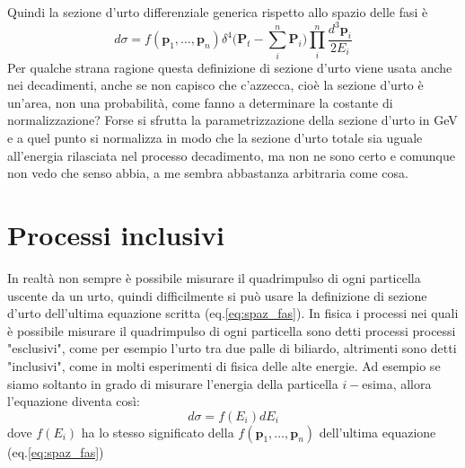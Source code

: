 \documentclass[11pt,a4paper]{article}
\newcommand{\vettore}[1]{\mathbf{#1}}
\begin{document}
		Quindi la sezione d'urto differenziale generica rispetto allo spazio delle fasi è
		\begin{equation}
			d\sigma=f(\vettore p_1,\dots,\vettore p_n)\delta^4\bigg(\vettore P_t-\sum_i^n \vettore P_i\bigg)\prod_i^n\frac{d^3\vettore p_i}{2E_i}
			\label{eq:spaz_fas}
		\end{equation} 
		Per qualche strana ragione questa definizione di sezione d'urto viene usata anche nei decadimenti, anche se non capisco che c'azzecca, cioè la sezione d'urto è un'area, non una probabilità, come fanno a determinare la costante di normalizzazione?\newline
		Forse si sfrutta la parametrizzazione della sezione d'urto in GeV e a quel punto si normalizza in modo che la sezione d'urto totale sia uguale all'energia rilasciata nel processo decadimento, ma non ne sono certo e comunque non vedo che senso abbia, a me sembra abbastanza arbitraria come cosa.


	\section{Processi inclusivi}
		In realtà non sempre è possibile misurare il quadrimpulso di ogni particella uscente da un urto, quindi difficilmente si può usare la definizione di sezione d'urto dell'ultima equazione scritta (eq.\ref{eq:spaz_fas}).\newline
		In fisica i processi nei quali è possibile misurare il quadrimpulso di ogni particella sono detti processi processi "esclusivi", come per esempio l'urto tra due palle di biliardo, altrimenti sono detti "inclusivi", come in molti esperimenti di fisica delle alte energie.\newline
		Ad esempio se siamo soltanto in grado di misurare l'energia della particella $i-$esima, allora l'equazione diventa così:
		\begin{equation}
			d\sigma=f(E_i)dE_i
		\end{equation}
		dove $f(E_i)$ ha lo stesso significato della $f(\vettore p_1,\dots,\vettore p_n)$ dell'ultima equazione (eq.\ref{eq:spaz_fas})
\end{document}
